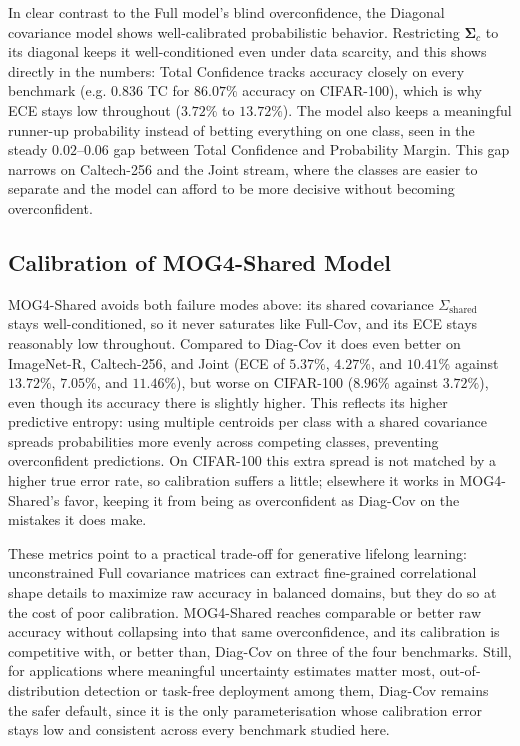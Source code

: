 In clear contrast to the Full model's blind overconfidence, the Diagonal covariance model shows well-calibrated probabilistic behavior. Restricting $\mathbf{\Sigma}_c$ to its diagonal keeps it well-conditioned even under data scarcity, and this shows directly in the numbers: Total Confidence tracks accuracy closely on every benchmark (e.g. $0.836$ TC for $86.07\%$ accuracy on CIFAR-100), which is why ECE stays low throughout ($3.72\%$ to $13.72\%$). The model also keeps a meaningful runner-up probability instead of betting everything on one class, seen in the steady $0.02$--$0.06$ gap between Total Confidence and Probability Margin. This gap narrows on Caltech-256 and the Joint stream, where the classes are easier to separate and the model can afford to be more decisive without becoming overconfident.

\subsection{Calibration of MOG4-Shared Model}
\label{sec:calibration:mog4shared}

MOG4-Shared avoids both failure modes above: its shared covariance $\Sigma_{\text{shared}}$ stays well-conditioned, so it never saturates like Full-Cov, and its ECE stays reasonably low throughout. Compared to Diag-Cov it does even better on ImageNet-R, Caltech-256, and Joint (ECE of $5.37\%$, $4.27\%$, and $10.41\%$ against $13.72\%$, $7.05\%$, and $11.46\%$), but worse on CIFAR-100 ($8.96\%$ against $3.72\%$), even though its accuracy there is slightly higher. This reflects its higher predictive entropy: using multiple centroids per class with a shared covariance spreads probabilities more evenly across competing classes, preventing overconfident predictions. On CIFAR-100 this extra spread is not matched by a higher true error rate, so calibration suffers a little; elsewhere it works in MOG4-Shared's favor, keeping it from being as overconfident as Diag-Cov on the mistakes it does make.

These metrics point to a practical trade-off for generative lifelong learning: unconstrained Full covariance matrices can extract fine-grained correlational shape details to maximize raw accuracy in balanced domains, but they do so at the cost of poor calibration. MOG4-Shared reaches comparable or better raw accuracy without collapsing into that same overconfidence, and its calibration is competitive with, or better than, Diag-Cov on three of the four benchmarks. Still, for applications where meaningful uncertainty estimates matter most, out-of-distribution detection or task-free deployment among them, Diag-Cov remains the safer default, since it is the only parameterisation whose calibration error stays low and consistent across every benchmark studied here.

